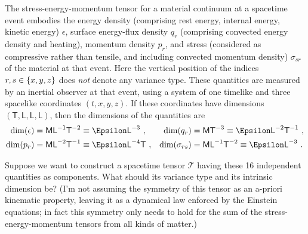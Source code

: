 \documentclass[\ifafour a4paper,12pt,\else a5paper,10pt,\fi%
onecolumn,oneside,article,%
british%
]{memoir}
\theoremstyle{remark}
\theoremstyle{innote}
\DeclarePairedDelimiter\set{\{}{\}}
\renewcommand*{\|}[1][]{\nonscript\,#1\vert\nonscript\;\mathopen{}}
\newcommand*{\Le}{\textsf{L}}
\newcommand*{\Ti}{\textsf{T}}
\newcommand*{\Ma}{\textsf{M}}
\newcommand*{\En}{\Epsilon}%
\newcommand*{\yT}{\bm{\mathcal{T}}}
\newcommand*{\en}{\epsilon}
\newcommand*{\yq}{q}
\newcommand*{\yp}{p}
\newcommand*{\yt}{\sigma}
\begin{document}
The stress-energy-momentum tensor for a material continuum at a spacetime
event embodies the energy density (comprising rest energy, internal energy,
kinetic energy) $\en$, surface energy-flux density $\yq_{r}$ (comprising
convected energy density and heating), momentum density $\yp_{r}$, and
stress (considered as compressive rather than tensile, and including
convected momentum density) $\yt_{sr}$ of the material at that event. Here
the vertical position of the indices $r,s \in \set{x,y,z}$ does \emph{not}
denote any variance type. These quantities are measured by an inertial
observer at that event, using a system of one timelike and three spacelike
coordinates $(t,x,y,z)$. If these coordinates have dimensions
$(\Ti,\Le,\Le,\Le)$, then the dimensions of the quantities are
\begin{equation}\label{eq:dims_stress_components}
  \begin{aligned}
    \dim(\en) &=\Ma\Le^{-1}\Ti^{-2} \equiv  \En\Le^{-3} \ ,
    &
    \dim(\yq_{r}) &=\Ma\Ti^{-3} \equiv  \En\Le^{-2}\Ti^{-1} \ ,
    \\
    \dim(\yp_{r}) &=\Ma\Le^{-2}\Ti^{-1} \equiv  \En\Le^{-4}\Ti \ ,
    &
    \dim(\yt_{rs}) &=\Ma\Le^{-1}\Ti^{-2} \equiv  \En\Le^{-3} \ .
  \end{aligned}
\end{equation}

Suppose we want to construct a spacetime tensor $\yT$ having these 16
independent quantities as components. What should its variance type and its
intrinsic dimension be? (I'm not assuming the symmetry of this tensor as an
a-priori kinematic property, leaving it as a dynamical law enforced by the
Einstein equations; in fact this symmetry only needs to hold for the sum of
the stress-energy-momentum tensors from all kinds of matter.)
\end{document}
